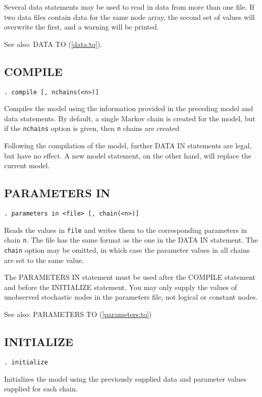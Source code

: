 \documentclass[11pt, a4paper, titlepage]{report}
\begin{document}
Several data statements may be used to read in data from more than one
file. If two data files contain data for the same node array, the second
set of values will overwrite the first, and a warning will be printed.

See also: DATA TO (\ref{data:to}).

\subsection{COMPILE}

\begin{verbatim}
. compile [, nchains(<n>)]
\end{verbatim}
Compiles the model using the information provided in the preceding
model and data statements. By default, a single Markov chain is
created for the model, but if the \texttt{nchains} option is given,
then \texttt{n} chains are created 

Following the compilation of the model, further DATA IN statements are
legal, but have no effect.  A new model statement, on the other hand,
will replace the current model.

\subsection{PARAMETERS IN}
\label{parameters:in}

\begin{verbatim}
. parameters in <file> [, chain(<n>)]
\end{verbatim}
Reads the values in \texttt{file} and writes them to the corresponding
parameters in chain \texttt{n}. The file has the same format as the
one in the DATA IN statement.  The \texttt{chain} option may be
omitted, in which case the parameter values in all chains are set to
the same value.

The PARAMETERS IN statement must be used after the COMPILE statement
and before the INITIALIZE statement.  You may only supply the values of
unobserved stochastic nodes in the parameters file, not logical or
constant nodes.

See also: PARAMETERS TO (\ref{parameters:to})

\subsection{INITIALIZE}

\begin{verbatim}
. initialize
\end{verbatim}
Initializes the model using the previously supplied data and parameter
values supplied for each chain.
\end{document}
